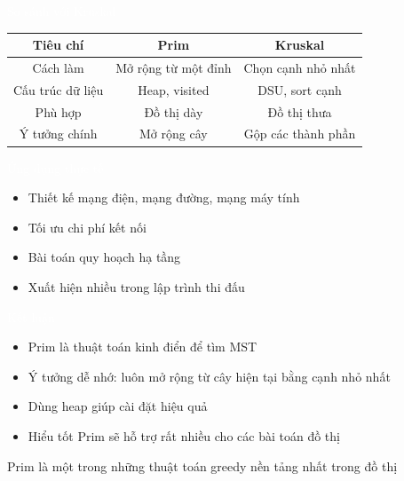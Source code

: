 \documentclass{beamer}
\newcommand{\hlblue}[1]{\textcolor{myblue}{#1}}
\newcommand{\hlpurple}[1]{\textcolor{mypurple}{#1}}
\newcommand{\hlwhite}[1]{\textcolor{white}{#1}}
\begin{document}

\begin{frame}{\hlwhite{So sánh với Kruskal}}
\begin{table}[]
\centering
\begin{tabular}{|c|c|c|}
\hline
\rowcolor{blue!10}
\textbf{Tiêu chí} & \textbf{Prim} & \textbf{Kruskal} \\
\hline
Cách làm & Mở rộng từ một đỉnh & Chọn cạnh nhỏ nhất \\
\hline
Cấu trúc dữ liệu & Heap, visited & DSU, sort cạnh \\
\hline
Phù hợp & Đồ thị dày & Đồ thị thưa \\
\hline
Ý tưởng chính & Mở rộng cây & Gộp các thành phần \\
\hline
\end{tabular}
\end{table}
\end{frame}


\begin{frame}{\hlwhite{Ứng dụng thực tế}}
\begin{itemize}
\item Thiết kế mạng điện, mạng đường, mạng máy tính
\item Tối ưu chi phí kết nối
\item Bài toán quy hoạch hạ tầng
\item Xuất hiện nhiều trong lập trình thi đấu
\end{itemize}
\end{frame}


\begin{frame}{\hlwhite{Kết luận}}
\begin{itemize}
\item Prim là thuật toán kinh điển để tìm MST
\item Ý tưởng dễ nhớ: \hlblue{luôn mở rộng từ cây hiện tại bằng cạnh nhỏ nhất}
\item Dùng heap giúp cài đặt hiệu quả
\item Hiểu tốt Prim sẽ hỗ trợ rất nhiều cho các bài toán đồ thị
\end{itemize}

\begin{tcolorbox}
\centering
\hlpurple{Prim là một trong những thuật toán greedy nền tảng nhất trong đồ thị}
\end{tcolorbox}
\end{frame}
\end{document}

